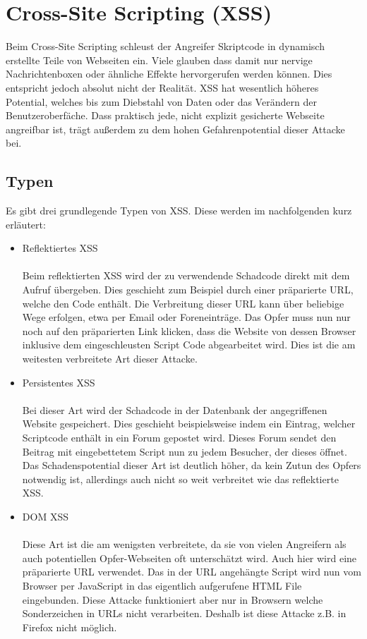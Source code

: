 \section{Cross-Site Scripting (XSS)}
Beim Cross-Site Scripting schleust der Angreifer Skriptcode in dynamisch erstellte Teile von Webseiten ein. Viele glauben dass damit nur nervige Nachrichtenboxen oder \"ahnliche Effekte hervorgerufen werden k\"onnen. Dies entspricht jedoch absolut nicht der Realit\"at. XSS hat wesentlich h\"oheres Potential, welches bis zum Diebstahl von Daten oder das Ver\"andern der Benutzeroberf\"ache. Dass praktisch jede, nicht explizit gesicherte Webseite angreifbar ist, tr\"agt au{\ss}erdem zu dem hohen Gefahrenpotential dieser Attacke bei.\cite{xssBuch}

\subsection{Typen}
Es gibt drei grundlegende Typen von XSS. Diese werden im nachfolgenden kurz erl\"autert:

\begin{itemize}
\item Reflektiertes XSS\\\\
Beim reflektierten XSS wird der zu verwendende Schadcode direkt mit dem Aufruf \"ubergeben. Dies geschieht zum Beispiel durch einer pr\"aparierte URL, welche den Code enth\"alt. Die Verbreitung dieser URL kann \"uber beliebige Wege erfolgen, etwa per Email oder Foreneintr\"age. Das Opfer muss nun nur noch auf den pr\"aparierten Link klicken, dass die Website von dessen Browser inklusive dem eingeschleusten Script Code abgearbeitet wird. Dies ist die am weitesten verbreitete Art dieser Attacke.\\
\item Persistentes XSS\\\\
Bei dieser Art wird der Schadcode in der Datenbank der angegriffenen Website gespeichert. Dies geschieht beispielsweise indem ein Eintrag, welcher Scriptcode enth\"alt in ein Forum gepostet wird. Dieses Forum sendet den Beitrag mit eingebettetem Script nun zu jedem Besucher, der dieses \"offnet. Das Schadenspotential dieser Art ist deutlich h\"oher, da kein Zutun des Opfers notwendig ist, allerdings auch nicht so weit verbreitet wie das reflektierte XSS.\\
\item DOM XSS\\\\
Diese Art ist die am wenigsten verbreitete, da sie von vielen Angreifern als auch potentiellen Opfer-Webseiten oft untersch\"atzt wird. Auch hier wird eine pr\"aparierte URL verwendet. Das in der URL angeh\"angte Script wird nun vom Browser per JavaScript in das eigentlich aufgerufene HTML File eingebunden. Diese Attacke funktioniert aber nur in Browsern welche Sonderzeichen in URLs nicht verarbeiten. Deshalb ist diese Attacke z.B. in Firefox nicht m\"oglich.
\cite{xssBuch}
\end{itemize}

